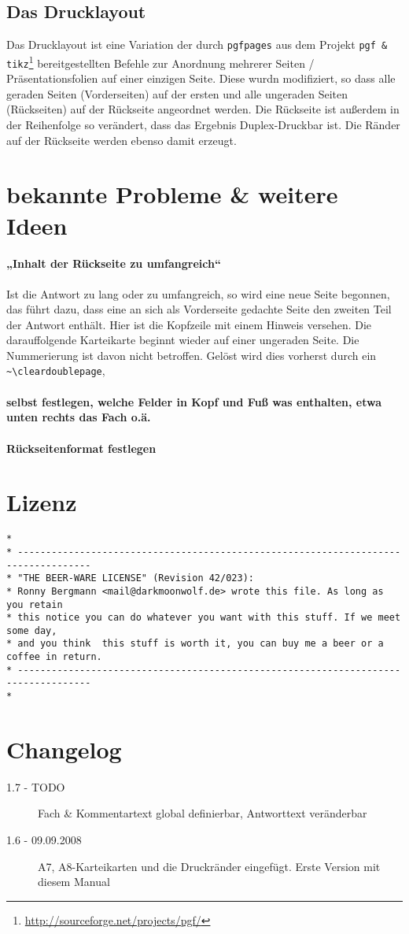 \documentclass[a4paper]{article}
\begin{document}
\subsection{Das Drucklayout}
Das Drucklayout ist eine Variation der durch \lstinline!pgfpages! aus dem Projekt \lstinline!pgf & tikz!\footnote{\url{http://sourceforge.net/projects/pgf/}} bereitgestellten Befehle zur Anordnung mehrerer Seiten / Präsentationsfolien auf einer einzigen Seite. Diese wurdn modifiziert, so dass alle geraden Seiten (Vorderseiten) auf der ersten und alle ungeraden Seiten (Rückseiten) auf der Rückseite angeordnet werden. Die Rückseite ist außerdem in der Reihenfolge so verändert, dass das Ergebnis Duplex-Druckbar ist. Die Ränder auf der Rückseite werden ebenso damit erzeugt. 
%
%
%
\section{bekannte Probleme \& weitere Ideen}
\paragraph{„Inhalt der Rückseite zu umfangreich“} %
Ist die Antwort zu lang oder zu umfangreich, so wird eine neue Seite begonnen, das führt dazu, dass eine an sich als Vorderseite gedachte Seite den zweiten Teil der Antwort enthält. Hier ist die Kopfzeile mit einem Hinweis versehen. Die darauffolgende Karteikarte beginnt wieder auf einer ungeraden Seite. Die Nummerierung ist davon nicht betroffen. Gelöst wird dies vorherst durch ein \lstinline!~\cleardoublepage!, 
\paragraph{selbst festlegen, welche Felder in Kopf und Fuß was enthalten, etwa unten rechts das Fach o.ä.}
\paragraph{Rückseitenformat festlegen}
\newpage
\section{Lizenz}
\begin{lstlisting}[basicstyle=\footnotesize\sffamily, numbers=none]
*
* -----------------------------------------------------------------------------------
* "THE BEER-WARE LICENSE" (Revision 42/023):
* Ronny Bergmann <mail@darkmoonwolf.de> wrote this file. As long as you retain 
* this notice you can do whatever you want with this stuff. If we meet some day,
* and you think  this stuff is worth it, you can buy me a beer or a coffee in return. 
* -----------------------------------------------------------------------------------
*
\end{lstlisting}

\section{Changelog}
\begin{description}
	\item[1.7 - TODO] Fach \& Kommentartext global definierbar, Antworttext veränderbar
	\item[1.6 - 09.09.2008] A7, A8-Karteikarten und die Druckränder eingefügt. Erste Version mit diesem Manual
\end{description}
\end{document}
